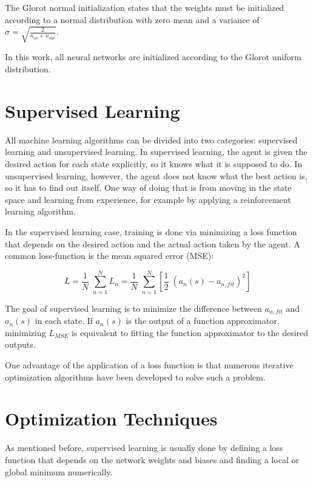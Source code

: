 The Glorot normal initialization states that the weights must be initialized according to a normal distribution with zero mean and a variance of $\sigma = \sqrt{\frac{2}{n_{in}+n_{out}}}$.

In this work, all neural networks are initialized according to the Glorot uniform distribution. 

\section{Supervised Learning}
All machine learning algorithms can be divided into two categories: supervised learning and unsupervised learning. In supervised learning, the agent is given the desired action for each state explicitly, so it knows what it is supposed to do. In unsupervised learning, however, the agent does not know what the best action is, so it has to find out itself. One way of doing that is from moving in the state space and learning from experience, for example by applying a reinforcement learning algorithm.

In the supervised learning case, training is done via minimizing a loss function that depends on the desired action and the actual action taken by the agent. A common loss-function is the mean squared error (MSE):

\begin{equation}
L = \frac{1}{N}\;\sum_{n=1}^{N}L_n =  \frac{1}{N}\;\sum_{n=1}^{N}[\frac{1}{2}\;(a_n(s)-a_{n,fit})^2]
\label{lossfun}
\end{equation}

The goal of supervised learning is to minimize the difference between $a_{n,fit}$ and $a_n(s)$ in each state. If $a_n(s)$ is the output of a function approximator, minimizing $L_{MSE}$ is equivalent to fitting the function approximator to the desired outputs.

One advantage of the application of a loss function is that numerous iterative optimization algorithms have been developed to solve such a problem.

\section{Optimization Techniques}

As mentioned before, supervised learning is usually done by defining a loss function that depends on the network weights and biases and finding a local or global minimum numerically.

